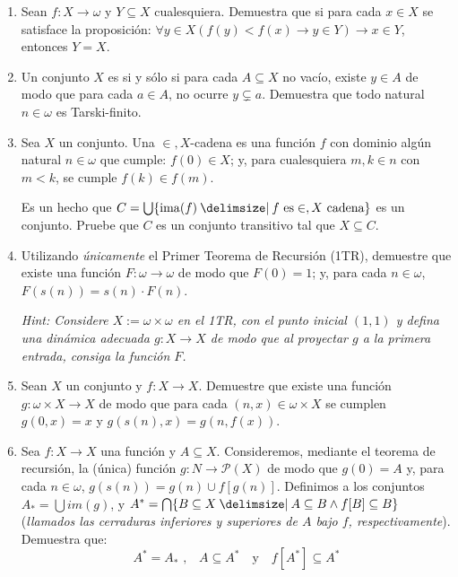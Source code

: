 \documentclass[11pt]{article}
\providecommand\st{\;|\;}
\newcommand\SetSymbol[1][]{%
    \nonscript\:#1\vert
    \allowbreak
    \nonscript\:
    \mathopen{}}
\renewcommand\st{\SetSymbol[\delimsize]}
\renewcommand\st{\SetSymbol[\delimsize]}
\newcommand{\set}[1]{\{#1\}}
\DeclareMathOperator{\ima}{ima}
\begin{document}
\begin{enumerate}[\bf\text{Ej.} 1.]
    \item Sean $f:X\to \omega$ y $Y\subseteq X$ cualesquiera. Demuestra que si para cada $x\in X$ se satisface la proposición: $\forall y\in X (f(y)<f(x) \to y\in Y) \to x\in Y$, entonces $Y=X$.
    
    \item Un conjunto $X$ es  si y sólo si para cada $A \subseteq X$ no vacío, existe $y \in A$ de modo que para cada $a \in A$, no ocurre $y \subsetneq a$. Demuestra que todo natural $n \in \omega$ es Tarski-finito.
   

    \item Sea $X$ un conjunto. Una $\in,X$-cadena es una función $f$ con dominio algún natural $n \in \omega$ que cumple: $f(0) \in X$; y, para cualesquiera $m,k \in n$ con $m<k$, se cumple $f(k) \in f(m)$. 
    
    Es un hecho que $C=\bigcup \{ \ima(f) \st f \text{ es} \in,X \text{ cadena}\}$ es un conjunto. Pruebe que $C$ es un conjunto transitivo tal que $X \subseteq C$.


    \item Utilizando \textit{únicamente} el Primer Teorema de Recursión (1TR), demuestre que existe una función $F:\omega \to \omega$ de modo que $F(0)=1$; y, para cada $n \in \omega$, $F(s(n))=s(n) \cdot F(n)$.
    
    \hfill \textit{Hint: Considere $X:=\omega \times \omega$ en el 1TR, con el punto inicial $(1,1)$ y defina una dinámica adecuada $g:X \to X$ de modo que al proyectar $g$ a la primera entrada, consiga la función $F$.}
    
    \item Sean $X$ un conjunto y $f:X \to X$. Demuestre que existe una función $g:\omega \times X \to X$ de modo que para cada $(n,x) \in \omega \times X$ se cumplen $g(0,x)=x$ y $g(s(n),x)=g(n,f(x))$.

    \item Sea $f\colon X\to X$ una función y $A\subseteq X$. Consideremos, mediante el teorema de recursión, la  (única) función $g\colon N\to \mathscr{P}(X)$ de modo que $g(0) = A$ y, para cada $n \in \omega$, $g(s(n)) = g(n)\cup f[g(n)]$.
    Definimos a los conjuntos $A_*=\bigcup im(g)$, y $A^*= \bigcap\set{B\subseteq X \st A\subseteq B \wedge f[B]\subseteq B}$ (\textit{llamados las cerraduras inferiores y superiores de $A$ bajo $f$, respectivamente}). Demuestra que:
    $$ A^*=A_* \text{ ,} \quad A\subseteq A^* \quad \text{y} \quad f[A^*]\subseteq A^* $$
    \end{enumerate}


  
\end{document}
